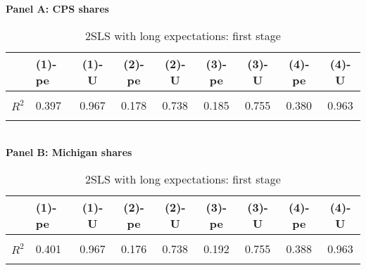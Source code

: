\begin{table}[!htbp] \centering
\caption{2SLS with long expectations: first stage}
\label{tab:base:5only:2sls:stage1}
\textbf{Panel A: CPS shares} \\ 
\begin{tabular}[t]{>{}llccccccc}
\toprule
  & (1)-pe & (1)-U & (2)-pe & (2)-U & (3)-pe & (3)-U & (4)-pe & (4)-U\\
\midrule
\textbf{\cellcolor{gray!10}{Coef.}} & \cellcolor{gray!10}{NA} & \cellcolor{gray!10}{0.579} & \cellcolor{gray!10}{NA} & \cellcolor{gray!10}{0.516} & \cellcolor{gray!10}{NA} & \cellcolor{gray!10}{0.446} & \cellcolor{gray!10}{NA} & \cellcolor{gray!10}{0.779}\\
\textbf{$R^2$} & 0.397 & 0.967 & 0.178 & 0.738 & 0.185 & 0.755 & 0.380 & 0.963\\
\textbf{\cellcolor{gray!10}{F (1st stage)}} & \cellcolor{gray!10}{6.199} & \cellcolor{gray!10}{197.406} & \cellcolor{gray!10}{65.717} & \cellcolor{gray!10}{204.326} & \cellcolor{gray!10}{62.025} & \cellcolor{gray!10}{145.662} & \cellcolor{gray!10}{5.276} & \cellcolor{gray!10}{604.334}\\
\bottomrule
\end{tabular} \vspace{5mm} 
\\ \textbf{Panel B: Michigan shares} \\ 
\begin{tabular}[t]{>{}llccccccc}
\toprule
  & (1)-pe & (1)-U & (2)-pe & (2)-U & (3)-pe & (3)-U & (4)-pe & (4)-U\\
\midrule
\textbf{\cellcolor{gray!10}{Coef.}} & \cellcolor{gray!10}{0.204} & \cellcolor{gray!10}{0.579} & \cellcolor{gray!10}{-0.347} & \cellcolor{gray!10}{0.516} & \cellcolor{gray!10}{-0.328} & \cellcolor{gray!10}{0.446} & \cellcolor{gray!10}{0.173} & \cellcolor{gray!10}{0.779}\\
\textbf{$R^2$} & 0.401 & 0.967 & 0.176 & 0.738 & 0.192 & 0.755 & 0.388 & 0.963\\
\textbf{\cellcolor{gray!10}{F (1st stage)}} & \cellcolor{gray!10}{6.636} & \cellcolor{gray!10}{197.406} & \cellcolor{gray!10}{42.850} & \cellcolor{gray!10}{204.326} & \cellcolor{gray!10}{45.730} & \cellcolor{gray!10}{145.662} & \cellcolor{gray!10}{8.904} & \cellcolor{gray!10}{604.334}\\
\bottomrule
\end{tabular}\end{table}

